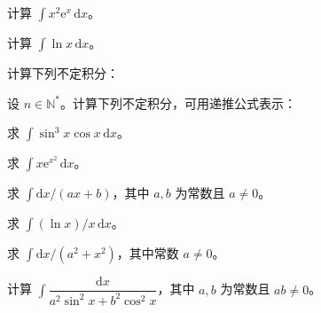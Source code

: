 \newpage
\noindent\begin{minipage}{\textwidth}
计算 $\int x^2\mathrm e^x\,\mathrm dx$。
\end{minipage}\par\vfill
\noindent\begin{minipage}{\textwidth}
计算 $\int\ln x\,\mathrm dx$。
\end{minipage}\par\vfill
\noindent\begin{minipage}{\textwidth}
计算下列不定积分：
\end{minipage}\par\vfill
\newpage
\noindent\begin{minipage}{\textwidth}
设 $n\in\mathbb N^*$。计算下列不定积分，可用递推公式表示：
\end{minipage}\par\vfill
\noindent\begin{minipage}{\textwidth}
求 $\int\sin^3x\cos x\,\mathrm dx$。
\end{minipage}\par\vfill
\noindent\begin{minipage}{\textwidth}
求 $\int x\mathrm e^{x^2}\,\mathrm dx$。
\end{minipage}\par\vfill
\newpage
\noindent\begin{minipage}{\textwidth}
求 $\int\mathrm dx/(ax+b)$，其中 $a,b$ 为常数且 $a\ne0$。
\end{minipage}\par\vfill
\noindent\begin{minipage}{\textwidth}
求 $\int(\ln x)/x\,\mathrm dx$。
\end{minipage}\par\vfill
\noindent\begin{minipage}{\textwidth}
求 $\int\mathrm dx/(a^2+x^2)$，其中常数 $a\ne0$。
\end{minipage}\par\vfill
\newpage
\noindent\begin{minipage}{\textwidth}
计算 $\int\dfrac{\mathrm dx}{a^2\sin^2x+b^2\cos^2x}$，其中 $a,b$ 为常数且 $ab\ne0$。
\end{minipage}\par\vfill
